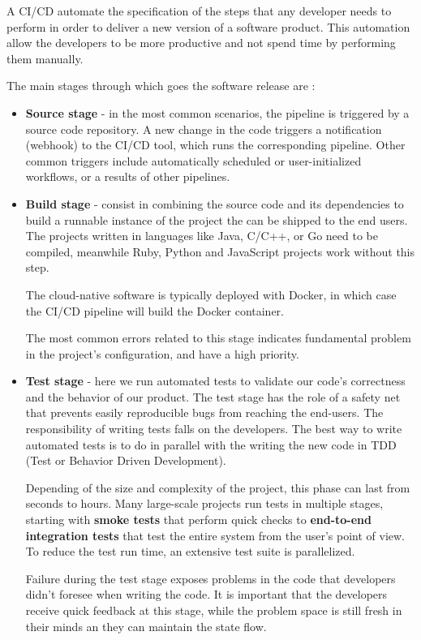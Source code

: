 \documentclass[12pt,a4paper,twoside]{article}
\begin{document}
A CI/CD automate the specification of the steps that any developer needs to perform in order to deliver a new version of a software product. This automation allow the developers to be more productive and not spend time by performing them manually.

The main stages through which goes the software release are \cite{ELEMENTS-CI/CD}:

\begin{itemize}
	\item \textbf{Source stage} - in the most common scenarios, the pipeline is triggered by a source code repository. A new change in the code triggers a notification (webhook) to the CI/CD tool, which runs the corresponding pipeline. Other common triggers include automatically scheduled or user-initialized workflows, or a results of other pipelines.

	\item \textbf{Build stage} - consist in combining the source code and its dependencies to build a runnable instance of the project the can be shipped to the end users. The projects written in languages like Java, C/C++, or Go need to be compiled, meanwhile Ruby, Python and JavaScript projects work without this step.

The cloud-native software is typically deployed with Docker, in which case the CI/CD pipeline will build the Docker container.

The most common errors related to this stage indicates fundamental problem in the project's configuration, and have a high priority.

	\item \textbf{Test stage} - here we run automated tests to validate our code's correctness and the behavior of our product. The test stage has the role of a safety net that prevents easily reproducible bugs from reaching the end-users.
The responsibility of writing tests falls on the developers. The best way to write automated tests is to do in parallel with the writing the new code in TDD (Test or Behavior Driven Development).

Depending of the size and complexity of the project, this phase can last from seconds to hours. Many large-scale projects run tests in multiple stages, starting with \textbf{smoke tests} that perform quick checks to \textbf{end-to-end integration tests} that test the entire system from the user's point of view. To reduce the test run time, an extensive test suite is parallelized.

Failure during the test stage exposes problems in the code that developers didn't foresee when writing the code. It is important that the developers receive quick feedback at this stage, while the problem space is still fresh in their minds an they can maintain the state flow.


\end{itemize}
\end{document}
